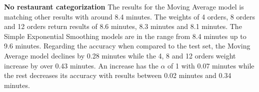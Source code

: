 \begin{table}[h]
\centering
\caption{Weekday categorization with slots}
\label{Weekday and slot categorization results}
\end{table}
\newline\newline\textbf{No restaurant categorization}\newline
The results for the Moving Average model is matching other results with around 8.4 minutes. The weights of 4 orders, 8 orders and 12 orders return results of 8.6 minutes, 8.3 minutes and 8.1 minutes. The Simple Exponential Smoothing models are in the range from 8.4 minutes up to 9.6 minutes. Regarding the accuracy when compared to the test set, the Moving Average model declines by 0.28 minutes while the 4, 8 and 12 orders weight increase by over 0.43 minutes. An increase has the $\alpha$ of 1 with 0.07 minutes while the rest decreases its accuracy with results between 0.02 minutes and 0.34 minutes.\newline
